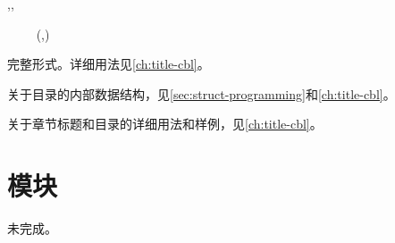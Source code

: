 \documentclass{cusdoc}
\begin{document}
\begin{function}{\SetSpecifiedCombinedListStyle,\SpecifiedCombinedList,
  \LocalSpecifiedCombinedList}
  \begin{syntax}
    \V\SetSpecifiedCombinedListStyle {} 
    ~~~~    
    \V\SpecifiedCombinedList {}
    \V\LocalSpecifiedCombinedList {}
    \V\LocalSpecifiedCombinedList {} \string(,\string)
  \end{syntax}
完整形式。详细用法见\cref{ch:title-cbl}。
\end{function}

关于目录的内部数据结构，见\cref{sec:struct-programming}和\cref{ch:title-cbl}。

关于章节标题和目录的详细用法和样例，见\cref{ch:title-cbl}。

\section{模块}
未完成。\TODO 





\end{document}
